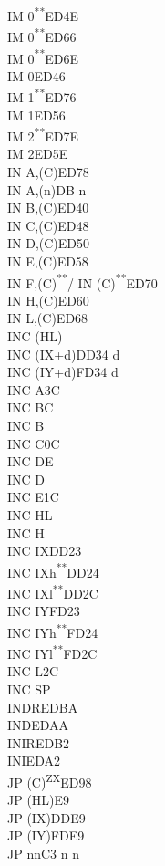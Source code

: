 \documentclass[twoside,openright,a4paper]{book}
\newcommand{\UNDOC}{\textnormal{\textsuperscript{**}}}
\newcommand{\ZXN}{\textnormal{\textsuperscript{ZX}}}
\begin{document}
\begin{multicols}{3}
{\begin{tabbing}
	IM 0\UNDOC\>ED4E\\
	IM 0\UNDOC\>ED66\\
	IM 0\UNDOC\>ED6E\\
	IM 0\>ED46\\
	IM 1\UNDOC\>ED76\\
	IM 1\>ED56\\
	IM 2\UNDOC\>ED7E\\
	IM 2\>ED5E\\
	IN A,(C)\>ED78\\
	IN A,(n)\>DB n\\
	IN B,(C)\>ED40\\
	IN C,(C)\>ED48\\
	IN D,(C)\>ED50\\
	IN E,(C)\>ED58\\
	IN F,(C)\UNDOC / IN (C)\UNDOC\>ED70\\
	IN H,(C)\>ED60\\
	IN L,(C)\>ED68\\
	INC (HL)\\
	INC (IX+d)\>DD34 d\\
	INC (IY+d)\>FD34 d\\
	INC A\>3C\\
	INC BC\\
	INC B\\
	INC C\>0C\\
	INC DE\\
	INC D\\
	INC E\>1C\\
	INC HL\\
	INC H\\
	INC IX\>DD23\\
	INC IXh\UNDOC\>DD24\\
	INC IXl\UNDOC\>DD2C\\
	INC IY\>FD23\\
	INC IYh\UNDOC\>FD24\\
	INC IYl\UNDOC\>FD2C\\
	INC L\>2C\\
	INC SP\\
	INDR\>EDBA\\
	IND\>EDAA\\
	INIR\>EDB2\\
	INI\>EDA2\\
	JP (C)\ZXN\>ED98\\
	JP (HL)\>E9\\
	JP (IX)\>DDE9\\
	JP (IY)\>FDE9\\
	JP nn\>C3 n n\\

\end{tabbing}}
\end{multicols}
\end{document}
